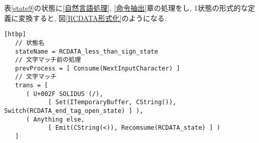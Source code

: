 \documentclass[uplatex,a4j]{jsreport}
\begin{document}
表\ref{state9}の状態に\ref{自然言語処理}, \ref{命令抽出}章の処理をし, 1状態の形式的な定義に変換すると, 
図\ref{RCDATA形式化}のようになる. 

\begin{lstlisting}[basicstyle=\ttfamily\footnotesize, frame=single, caption=RCDATA less-than sign stateの形式化, label=RCDATA形式化][htbp]
   // 状態名
   stateName = RCDATA_less_than_sign_state
   // 文字マッチ前の処理
   prevProcess = [ Consume(NextInputCharacter) ]
   // 文字マッチ
   trans = [
      ( U+002F SOLIDUS (/), 
            [ Set(ITemporaryBuffer, CString()), Switch(RCDATA_end_tag_open_state) ] ),
      ( Anything else, 
            [ Emit(CString(<)), Recomsume(RCDATA_state) ] )
   ]
\end{lstlisting}
\end{document}
